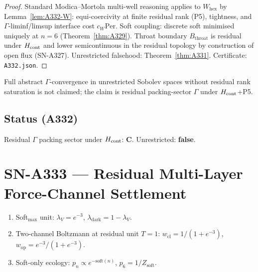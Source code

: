 \begin{proof}
Standard Modica--Mortola multi-well reasoning applies to $W_{\mathrm{hex}}$ by Lemma~\ref{lem:A332-W}: equi-coercivity at finite residual rank (P5), tightness, and $\Gamma$-liminf/limsup interface cost $c_W\mathrm{Per}$.
Soft coupling: discrete soft minimised uniquely at $n=6$ (Theorem~\ref{thm:A329}).
Throat boundary $B_{\mathrm{throat}}$ is residual under $H_{\rm cont}$ and lower semicontinuous in the residual topology by construction of open flux (SN-A327).
Unrestricted falsehood: Theorem~\ref{thm:A331}.
Certificate: \texttt{A332.json}.
\end{proof}

\begin{remark}
Full abstract $\Gamma$-convergence in unrestricted Sobolev spaces without residual rank saturation is not claimed; the claim is residual packing-sector $\Gamma$ under $H_{\rm cont}$+P5.
\end{remark}

\subsection*{Status (A332)}
Residual $\Gamma$ packing sector under $H_{\rm cont}$: \textbf{C}. Unrestricted: \textbf{false}.

\section{SN-A333 --- Residual Multi-Layer Force-Channel Settlement}
\label{sec:SN-A333}

\begin{definition}
\label{def:A333-L}
\begin{enumerate}[label=(L\arabic*)]
\item Soft$_{\max}$ unit: $\lambda_V=e^{-3}$, $\lambda_{\mathrm{dark}}=1-\lambda_V$.
\item Two-channel Boltzmann at residual unit $T=1$: $w_{\mathrm{cl}}=1/(1+e^{-3})$, $w_{\mathrm{op}}=e^{-3}/(1+e^{-3})$.
\item Soft-only ecology: $p_n\propto e^{-\mathrm{soft}(n)}$, $p_6=1/Z_{\mathrm{soft}}$.
\end{enumerate}
\end{definition}


